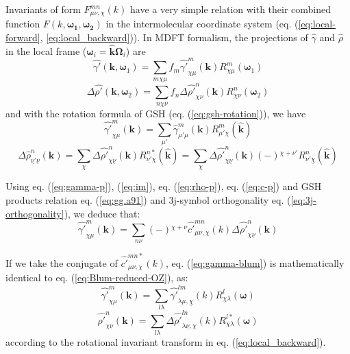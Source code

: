 Invariants of form $F_{\mu\nu,\chi}^{mn}(k)$ have a very simple relation
with their combined function $F(k,\boldsymbol{\omega_{1}},\boldsymbol{\omega_{2}})$
in the intermolecular coordinate system (eq. (\ref{eq:local-forward},
\ref{eq:local_backward})). In \acs{MDFT} formalism, the projections
of $\hat{\gamma}$ and $\hat{\rho}$ in the local frame ($\boldsymbol{\omega}_{i}=\hat{\mathbf{k}}\mathbf{\Omega}_{i}$)
are
\begin{equation}
\hat{\gamma'}(\mathbf{k},\boldsymbol{\omega}_{1})=\sum_{m\chi\mu}f_{m}\hat{\gamma'}_{\chi\mu}^{m}(\mathbf{k})R_{\chi\mu}^{m}(\boldsymbol{\omega}_{1})\label{eq:gamma-projection-local}
\end{equation}
\begin{equation}
\Delta\hat{\rho'}(\mathbf{k},\boldsymbol{\omega}_{2})=\sum_{n\chi\nu}f_{n}\Delta\hat{\rho'}_{\chi\nu}^{n}(\mathbf{k})R_{\chi\nu}^{n}(\mathbf{\boldsymbol{\omega}}_{2})\label{eq:delta-rho-projection-local}
\end{equation}
and with the rotation formula of \acs{GSH} (eq. (\ref{eq:gsh-rotation})),
we have 
\begin{equation}
\hat{\gamma'}_{\chi\mu}^{m}(\mathbf{k})=\sum_{\mu'}\hat{\gamma}_{\mu'\mu}^{m}(\mathbf{k})R_{\mu'\chi}^{m}(\hat{\mathbf{k}})\label{eq:gamma-p}
\end{equation}
\begin{equation}
\Delta\hat{\rho}_{\underline{\nu'}\underline{\nu}}^{n}(\mathbf{k})=\sum_{\chi}\Delta\hat{\rho'}_{\chi\underline{\nu}}^{n}(\mathbf{k})R_{\underline{\nu'}\chi}^{n*}(\hat{\mathbf{k}})=\sum_{\chi}\Delta\hat{\rho'}_{\chi\underline{\nu}}^{n}(\mathbf{k})\left(-\right){}^{\chi+\nu'}R_{\nu'\underline{\chi}}^{n}(\hat{\mathbf{k}})\label{eq:rho-p}
\end{equation}

Using eq. (\ref{eq:gamma-p}), (\ref{eq:im}), eq. (\ref{eq:rho-p}),
eq. (\ref{eq:c-p}) and \acs{GSH} products relation eq. (\ref{eq:gg.a91})
and 3j-symbol orthogonality eq. (\ref{eq:3j-orthogonality}), we deduce
that:
\begin{equation}
\hat{\gamma'}_{\chi\mu}^{m}(\mathbf{k})=\sum_{n\nu}\left(-\right){}^{\chi+\nu}\hat{c'}_{\mu\nu,\chi}^{mn}(k)\Delta\hat{\rho'}_{\chi\underline{\nu}}^{n}(\mathbf{k})\label{eq:gamma-blum}
\end{equation}

If we take the conjugate of $\hat{c'}_{\mu\nu,\chi}^{mn*}(k)$, eq.
(\ref{eq:gamma-blum}) is mathematically identical to eq. (\ref{eq:Blum-reduced-OZ}),
as:
\begin{equation}
\hat{\gamma'}_{\chi\mu}^{m}(\mathbf{k})=\sum_{l\lambda}\hat{\gamma'}_{\lambda\mu,\underline{\chi}}^{lm}(k)R_{\underline{\chi}\lambda}^{l}(\boldsymbol{\omega})
\end{equation}
\begin{equation}
\hat{\rho'}_{\chi\underline{\nu}}^{n}(\mathbf{k})=\sum_{l\lambda}\Delta\hat{\rho'}_{\lambda\underline{\nu},\chi}^{ln}(k)R_{\chi\lambda}^{l*}(\boldsymbol{\omega})
\end{equation}
according to the rotational invariant transform in eq. (\ref{eq:local_backward}).

